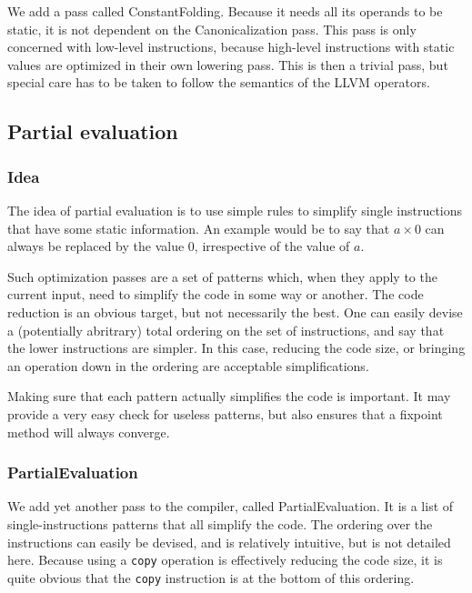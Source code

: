 \documentclass[11pt,a4paper]{article}
\newcommand{\scala}[1]{\textsf{#1}}
\newcommand{\nir}[1]{\texttt{#1}}
\begin{document}
We add a pass called \scala{ConstantFolding}. Because it needs all its operands to be static, it is not dependent on the \scala{Canonicalization} pass. This pass is only concerned with low-level instructions, because high-level instructions with static values are optimized in their own lowering pass. This is then a trivial pass, but special care has to be taken to follow the semantics of the LLVM operators.

\subsection{Partial evaluation}

\subsubsection*{Idea}

The idea of partial evaluation is to use simple rules to simplify single instructions that have some static information. An example would be to say that $a \times 0$ can always be replaced by the value $0$, irrespective of the value of $a$.

Such optimization passes are a set of patterns which, when they apply to the current input, need to simplify the code in some way or another. The code reduction is an obvious target, but not necessarily the best. One can easily devise a (potentially abritrary) total ordering on the set of instructions, and say that the lower instructions are simpler. In this case, reducing the code size, or bringing an operation down in the ordering are acceptable simplifications.

Making sure that each pattern actually simplifies the code is important. It may provide a  very easy check for useless patterns, but also ensures that a fixpoint method will always converge.

\subsubsection*{PartialEvaluation}

We add yet another pass to the compiler, called \scala{PartialEvaluation}. It is a list of single-instructions patterns that all simplify the code. The ordering over the instructions can easily be devised, and is relatively intuitive, but is not detailed here. Because using a \nir{copy} operation is effectively reducing the code size, it is quite obvious that the \nir{copy} instruction is at the bottom of this ordering.
\end{document}
